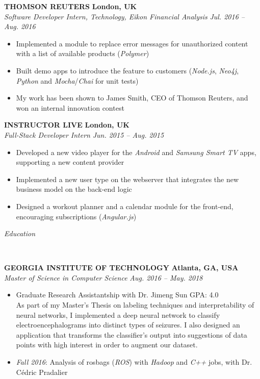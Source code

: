 \documentclass[a4paper, 12pt]{article}
\newcommand{\marginline}{-0.3cm}
\newcommand{\margincontent}{-0.6cm}
\newcommand{\marginbeforesection}{0.35cm}
\newcommand{\linewidthperso}{0.02cm}
\newcommand{\styletitle}[1]{\textbf{#1}}
\newcommand{\styledesc}[1]{\textit{#1}}
\newcommand{\styleloc}[1]{\textbf{#1}}
\newcommand{\styledates}[1]{\textit{#1}}
\newcommand{\stylesection}[1]{
  \vspace{\marginbeforesection}
  \begin{normalsize}\textit{#1}\end{normalsize}
  \vspace{\marginline}\\
  \noindent\makebox[\linewidth]{\rule{\textwidth}{\linewidthperso}}

}
\begin{document}
\begin{footnotesize}
\styletitle{THOMSON REUTERS} \hfill \styleloc{London, UK}\\
\styledesc{Software Developer Intern, Technology, Eikon Financial Analysis} \hfill \styledates{Jul. 2016 -- Aug. 2016}\\
\vspace{\margincontent}
\begin{itemize}
  \item Implemented a module to replace error messages for unauthorized content with a list of available products (\textit{Polymer})
  \item Built demo apps to introduce the feature to customers (\textit{Node.js}, \textit{Neo4j}, \textit{Python} and \textit{Mocha}/\textit{Chai} for unit tests)
  \item My work has been shown to James Smith, CEO of Thomson Reuters, and won an internal innovation contest
\end{itemize}

\styletitle{INSTRUCTOR LIVE} \hfill \styleloc{London, UK}\\
\styledesc{Full-Stack Developer Intern} \hfill \styledates{Jun. 2015 -- Aug. 2015}\\
\vspace{\margincontent}
\begin{itemize}
  \item Developed a new video player for the \textit{Android} and \textit{Samsung Smart TV} apps, supporting a new content provider
  \item Implemented a new user type on the webserver that integrates the new business model on the back-end logic
  \item Designed a workout planner and a calendar module for the front-end, encouraging subscriptions (\textit{Angular.js})
\end{itemize}

\stylesection{Education}

\styletitle{GEORGIA INSTITUTE OF TECHNOLOGY} \hfill \styleloc{Atlanta, GA, USA}\\
\styledesc{Master of Science in Computer Science} \hfill \styledates{Aug. 2016 -- May. 2018}\\
\vspace{\margincontent}
\begin{itemize}
  \item Graduate Research Assistantship with Dr. Jimeng Sun \hfill GPA: 4.0 \\
  As part of my Master's Thesis on labeling techniques and interpretability of neural networks, I implemented a deep neural network to classify electroencephalograms into distinct types of seizures. I also designed an application that transforms the classifier's output into suggestions of data points with high interest in order to augment our dataset.
  \item \textit{Fall 2016}: Analysis of rosbags (\textit{ROS}) with \textit{Hadoop} and \textit{C++} jobs, with Dr. C\'edric Pradalier
\end{itemize}


\end{footnotesize}
\end{document}
